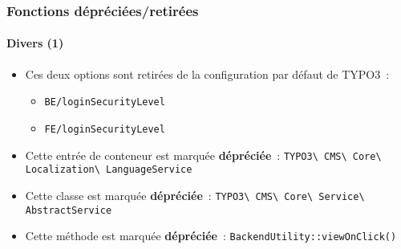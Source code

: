 %

\begin{frame}[fragile]
	\frametitle{Fonctions dépréciées/retirées}
	\framesubtitle{Divers (1)}

	\begin{itemize}
		\item Ces deux options sont retirées de la configuration par défaut de \newline
		    TYPO3~:
			\begin{itemize}
				\item \texttt{BE/loginSecurityLevel}
				\item \texttt{FE/loginSecurityLevel}
			\end{itemize}

		\item Cette entrée de conteneur est marquée \textbf{dépréciée}~:\newline
			\small\texttt{TYPO3\textbackslash
				CMS\textbackslash
				Core\textbackslash
				Localization\textbackslash
				LanguageService}\normalsize

		\item Cette classe est marquée \textbf{dépréciée}~:\newline
			\texttt{TYPO3\textbackslash
				CMS\textbackslash
				Core\textbackslash
				Service\textbackslash
				AbstractService}

		\item Cette méthode est marquée \textbf{dépréciée}~:\newline
			\texttt{BackendUtility::viewOnClick()}

	\end{itemize}

\end{frame}

